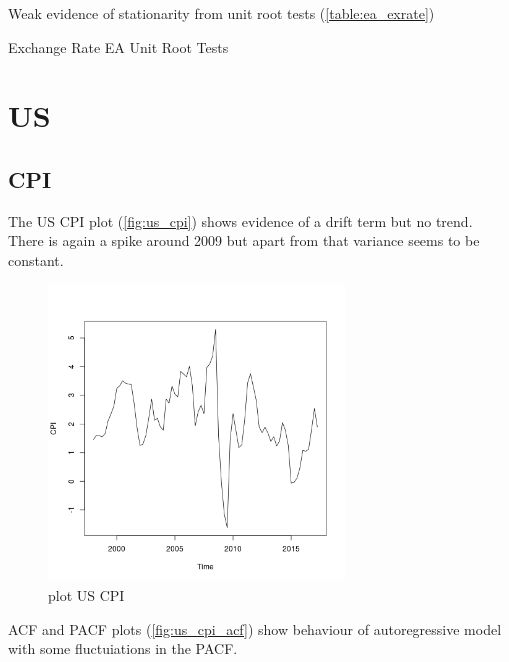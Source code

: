 \documentclass[10pt]{article}
\begin{document}
Weak evidence of stationarity from unit root tests (\autoref{table:ea_exrate})

\begin{table}[h!]
\centering
{}
\caption{Exchange Rate EA Unit Root Tests}
\label{table:ea_exrate}
\end{table}



\pagebreak



\section{US}
\label{sec:us}

\subsection{CPI}

The US CPI plot (\autoref{fig:us_cpi}) shows evidence of a drift term but no trend. There is again a spike around 2009 but apart from that variance seems to be constant.

\begin{figure}[h!]
\centering
\includegraphics[width = 0.7\textwidth]{../plots/us_CPI}
\caption{plot US CPI}
\label{fig:us_cpi}
\end{figure}

ACF and PACF plots (\autoref{fig:us_cpi_acf}) show behaviour of autoregressive model with some fluctuiations in the PACF.
\end{document}
